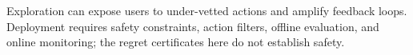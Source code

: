 %
%
%
%
%
%
%
%
Exploration can expose users to under-vetted actions and amplify feedback loops.
Deployment requires safety constraints, action filters, offline evaluation, and
online monitoring; the regret certificates here do not establish safety.
